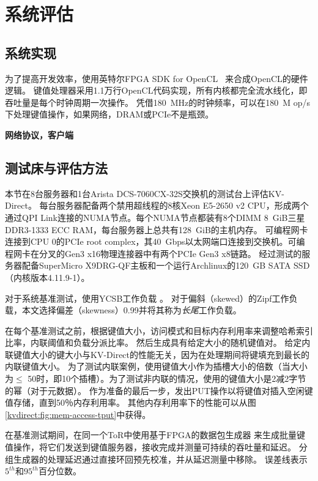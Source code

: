 \section{系统评估}
\label{kvdirect:sec:eval}
\label{kvdirect:sec:evaluation}
\label{kvdirect:sec:system-benchmark}

\subsection{系统实现}

为了提高开发效率，使用英特尔FPGA SDK for OpenCL~ \cite {aoc}来合成OpenCL的硬件逻辑。
键值处理器采用1.1万行OpenCL代码实现，所有内核都完全流水线化，即吞吐量是每个时钟周期一次操作。
凭借180~MHz的时钟频率，可以在180~M op/s下处理键值操作，如果网络，DRAM或PCIe不是瓶颈。


\textbf{网络协议，客户端}


\subsection{测试床与评估方法}

本节在8台服务器和1台Arista DCS-7060CX-32S交换机的测试台上评估KV-Direct。
每台服务器配备两个禁用超线程的8核Xeon E5-2650 v2 CPU，形成两个通过QPI Link连接的NUMA节点。每个NUMA节点都装有8个DIMM 8~GiB三星DDR3-1333 ECC RAM，每台服务器上总共有128~GiB的主机内存。
可编程网卡~ \cite {caulfield2016cloud}连接到CPU 0的PCIe root complex，其40~Gbps以太网端口连接到交换机。可编程网卡在分叉的Gen3 x16物理连接器中有两个PCIe Gen3 x8链路。
经过测试的服务器配备SuperMicro X9DRG-QF主板和一个运行Archlinux的120~GB SATA SSD（内核版本4.11.9-1）。

对于系统基准测试，使用YCSB工作负载 \cite {cooper2010benchmarking}。
对于偏斜（skewed）的Zipf工作负载，本文选择偏差（skewness）0.99并将其称为\textit {长尾}工作负载。

在每个基准测试之前，根据键值大小，访问模式和目标内存利用率来调整哈希索引比率，内联阈值和负载分派比率。
然后生成具有给定大小的随机键值对。
给定内联键值大小的键大小与KV-Direct的性能无关，因为在处理期间将键填充到最长的内联键值大小。
为了测试内联案例，使用键值大小作为插槽大小的倍数（当大小为$ \leq $ 50时，即10个插槽）。为了测试非内联的情况，使用的键值大小是2减2字节的幂（对于元数据）。
作为准备的最后一步，发出PUT操作以将键值对插入空闲键值存储，直到50％内存利用率。
其他内存利用率下的性能可以从图 \ref {kvdirect:fig:mem-access-tput}中获得。

在基准测试期间，在同一个ToR中使用基于FPGA的数据包生成器 \cite {li2016clicknp}来生成批量键值操作，将它们发送到键值服务器，接收完成并测量可持续的吞吐量和延迟。
分组生成器的处理延迟通过直接环回预先校准，并从延迟测量中移除。
误差线表示$ 5^{th} $和$ 95^{th} $百分位数。

